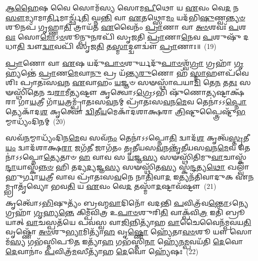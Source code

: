 \-\ul{𑌆}\-\-\ul{𑌹𑍈}\-𑌷 𑌵𑍈 𑌸𑍋𑌮᳴𑌸𑍍𑌯 𑌸𑍋𑌮\-\ul{𑌪𑍀}\-𑌥𑍋 𑌯 \ul{𑌏}\-𑌵𑌂 𑌵𑍇\-\ul{𑌦} 𑌨 \ul{𑌸𑍗}\-𑌮𑍍𑌯𑌾𑌮𑌾\-\ul{𑌰𑍍𑌤𑌿}\-𑌮𑌾𑌰𑍍𑌚𑍍𑌛᳴\-\ul{𑌤𑌿} 𑌘𑍍𑌨\-\ul{𑌨𑍍𑌤𑌿} 𑌵𑌾 \ul{𑌏}\-𑌤𑌥𑍍𑌸𑍋\-\ul{𑌮𑌂} 𑌯𑌦᳴𑌭𑌿\-\ul{𑌷𑍁}\-𑌣𑍍𑌵\-\ul{𑌨𑍍𑌤𑍍𑌯}\-\-\ul{𑍞}\-𑌶𑍂𑌨𑌪᳴ 𑌗𑍃𑌹𑍍𑌣𑌾\-\ul{𑌤𑌿} 𑌤𑍍𑌰𑌾𑌯᳴𑌤 \ul{𑌏}\-𑌵𑍈𑌨𑌂᳴ \ul{𑌪𑍍𑌰𑌾}\-𑌣𑌾 𑌵𑌾 \ul{𑌅}\-\-\ul{𑍞}\-𑌶𑌵𑌃᳴ \ul{𑌪}\-𑌶\-\ul{𑌵𑌃} 𑌸𑍋\-\ul{𑌮𑍋}\-\-𑌽\-\ul{𑍞}\-𑌶𑍂𑌨𑍍𑌪𑍁\-\ul{𑌨}\-𑌰𑌪𑌿᳴ 𑌸𑍃𑌜𑌤𑌿 \ul{𑌪𑍍𑌰𑌾}\-𑌣𑌾\-\ul{𑌨𑍇}\-𑌵 \ul{𑌪}\-𑌶𑍁𑌷𑍁᳴ 𑌦𑌧𑌾\-\ul{𑌤𑌿} 𑌦𑍍𑌵𑍗\-\ul{𑌦𑍍𑌵𑌾}\-𑌵𑌪𑌿᳴ 𑌸𑍃𑌜\-\ul{𑌤𑌿} 𑌤\-\ul{𑌸𑍍𑌮𑌾}\-𑌦𑍍𑌦𑍍𑌵𑍗𑌦𑍍𑌵𑍗॑ \ul{𑌪𑍍𑌰𑌾}\-𑌣𑌾𑌃॥~(19)

{\anuvakamend[{𑌯𑌜𑍁᳴𑌷𑌾 𑌮𑌿𑌮𑍀𑌤 𑌏\-\ul{𑌨𑌂} 𑌜𑌾\-\ul{𑌗𑍃}\-𑌵𑍀\-\ul{𑌤𑌿} 𑌚𑌤𑍁᳴𑌶𑍍𑌚𑌤𑍍𑌵𑌾𑌰𑌿𑍞𑌶𑌚𑍍𑌚}]}%

\-\ul{𑌪𑍍𑌰𑌾}\-𑌣𑍋 𑌵𑌾 \ul{𑌏}\-𑌷 𑌯𑌦𑍁᳴\-\ul{𑌪𑌾}\-\-\ul{𑍞}\-𑌶𑍁𑌰𑍍𑌯𑌦𑍁᳴\-\ul{𑌪𑌾}\-\-\ul{𑍞}\-𑌶𑍍𑌵᳴\-\ul{𑌗𑍍𑌰𑌾} 𑌗𑍍𑌰𑌹𑌾᳴ \ul{𑌗𑍃}\-𑌹𑍍𑌯𑌨𑍍𑌤𑍇॑ \ul{𑌪𑍍𑌰𑌾}\-𑌣\-\ul{𑌮𑍇}\-𑌵𑌾\-\ul{𑌨𑍁} 𑌪𑍍𑌰 𑌯᳴𑌨𑍍𑌤𑍍𑌯\-\ul{𑌰𑍁}\-𑌣𑍋 𑌹᳴ \ul{𑌸𑍍𑌮𑌾}\-𑌹𑍗𑌪᳴𑌵𑍇𑌶𑌿𑌃 𑌪𑍍𑌰𑌾𑌤𑌃𑌸\-\ul{𑌵}\-𑌨 \ul{𑌏}\-𑌵𑌾𑌹𑌂 \ul{𑌯}\-𑌜𑍍𑌞𑍞 𑌸𑍟𑌸𑍍𑌥𑌾᳴𑌪𑌯𑌾\-\ul{𑌮𑌿} 𑌤𑍇\-\ul{𑌨} 𑌤\-\ul{𑌤𑌃} 𑌸𑍟𑌸𑍍𑌥𑌿᳴𑌤𑍇𑌨 𑌚\-\ul{𑌰𑌾}\-𑌮𑍀\-\ul{𑌤𑍍𑌯}\-𑌷𑍍𑌟𑍗 𑌕𑍃𑌤𑍍𑌵𑍋\-𑌽\-\ul{𑌗𑍍𑌰𑍇}\-\-𑌽𑌭𑌿 𑌷𑍁᳴𑌣𑍋\-\ul{𑌤𑍍𑌯}\-𑌷𑍍𑌟𑌾𑌕𑍍𑌷᳴𑌰𑌾 𑌗𑌾\-\ul{𑌯}\-𑌤𑍍𑌰𑍀 𑌗𑌾᳴\-\ul{𑌯}\-𑌤𑍍𑌰𑌮𑍍𑌪𑍍𑌰𑌾᳴𑌤𑌃𑌸\-\ul{𑌵}\-𑌨𑌮𑍍 𑌪𑍍𑌰𑌾᳴𑌤𑌃𑌸\-\ul{𑌵}\-𑌨\-\ul{𑌮𑍇}\-𑌵 𑌤𑍇𑌨𑌾॑𑌽𑌽\-\ul{𑌪𑍍𑌨𑍋}\-𑌤𑍍𑌯𑍇𑌕𑌾᳴\-𑌦\-\ul{𑌶} 𑌕𑍃𑌤𑍍𑌵𑍋॑ \ul{𑌦𑍍𑌵𑌿}\-𑌤𑍀\-\ul{𑌯}\-𑌮𑍇𑌕𑌾᳴\-𑌦𑌶𑌾𑌕𑍍𑌷𑌰𑌾 \ul{𑌤𑍍𑌰𑌿}\-𑌷𑍍𑌟𑍁𑌪𑍍𑌤𑍍𑌰𑍈𑌷𑍍𑌟𑍁᳴\-\ul{𑌭}\-𑌮𑍍𑌮𑌾𑌧𑍍𑌯𑌂᳴𑌦𑌿𑌨𑌮𑍍~(20)

𑌸𑌵᳴\-\ul{𑌨}\-𑌮𑍍𑌮𑌾𑌧𑍍𑌯𑌂᳴𑌦𑌿𑌨\-\ul{𑌮𑍇}\-𑌵 𑌸𑌵᳴\-\ul{𑌨𑌂} 𑌤𑍇𑌨𑌾॑𑌽𑌽𑌪𑍍𑌨𑍋\-\ul{𑌤𑌿} 𑌦𑍍𑌵𑌾𑌦᳴\-\ul{𑌶} 𑌕𑍃𑌤𑍍𑌵᳴\-\ul{𑌸𑍍𑌤𑍃}\-𑌤𑍀\-\ul{𑌯𑌂} 𑌦𑍍𑌵𑌾𑌦᳴𑌶𑌾𑌕𑍍𑌷\-\ul{𑌰𑌾} 𑌜𑌗᳴\-\ul{𑌤𑍀} 𑌜𑌾𑌗᳴𑌤𑌂 𑌤𑍃𑌤𑍀𑌯𑌸\-\ul{𑌵}\-𑌨𑌨𑍍𑌤𑍃᳴𑌤𑍀𑌯𑌸\-\ul{𑌵}\-𑌨\-\ul{𑌮𑍇}\-𑌵 𑌤𑍇𑌨𑌾॑𑌽𑌽𑌪𑍍𑌨𑍋\-\ul{𑌤𑍍𑌯𑍇}\-𑌤𑌾𑍞 \ul{𑌹} 𑌵𑌾𑌵 𑌸 \ul{𑌯}\-𑌜𑍍𑌞\-\ul{𑌸𑍍𑌯} 𑌸𑍟𑌸𑍍𑌥𑌿᳴𑌤𑌿𑌮𑍁\-\ul{𑌵𑌾}\-𑌚𑌾𑌸𑍍𑌕᳴\-\ul{𑌨𑍍𑌦𑌾}\-𑌯𑌾𑌸𑍍𑌕᳴\-\ul{𑌨𑍍𑌨}\-\-\ul{𑍞} 𑌹𑌿 𑌤𑌦𑍍𑌯\-\ul{𑌦𑍍𑌯}\-𑌜𑍍𑌞\-\ul{𑌸𑍍𑌯} 𑌸𑍟𑌸𑍍𑌥𑌿᳴𑌤\-\ul{𑌸𑍍𑌯} 𑌸𑍍𑌕\-\ul{𑌨𑍍𑌦}\-𑌤𑍍𑌯\-\ul{𑌥𑍋} 𑌖𑌲𑍍𑌵𑌾᳴𑌹𑍁𑌰𑍍𑌗𑌾\-\ul{𑌯}\-𑌤𑍍𑌰𑍀 𑌵𑌾𑌵 𑌪𑍍𑌰𑌾᳴𑌤𑌃𑌸\-\ul{𑌵}\-𑌨𑍇 𑌨𑌾\-\ul{𑌤𑌿}\-𑌵𑌾\-\ul{𑌦} 𑌇𑌤𑍍𑌯𑌨᳴𑌤𑌿𑌵𑌾𑌦𑍁𑌕 𑌏\-\ul{𑌨}\-𑌮𑍍𑌭𑍍𑌰𑌾𑌤𑍃᳴𑌵𑍍𑌯𑍋 𑌭𑌵\-\ul{𑌤𑌿} 𑌯 \ul{𑌏}\-𑌵𑌂 𑌵𑍇\-\ul{𑌦} 𑌤𑌸𑍍𑌮𑌾᳴\-\ul{𑌦}\-𑌷𑍍𑌟𑌾𑌵᳴𑌷𑍍𑌟𑍗~(21)

𑌕𑍃𑌤𑍍𑌵𑍋᳴\-𑌽\-\ul{𑌭𑌿}\-𑌷𑍁𑌤𑍍𑌯𑌂᳴ 𑌬𑍍𑌰𑌹𑍍𑌮\-\ul{𑌵𑌾}\-𑌦𑌿𑌨𑍋᳴ 𑌵𑌦𑌨𑍍𑌤𑌿 \ul{𑌪}\-𑌵𑌿𑌤𑍍𑌰᳴𑌵\-\ul{𑌨𑍍𑌤𑍋}\-\-𑌽𑌨𑍍𑌯𑍇 𑌗𑍍𑌰𑌹𑌾᳴ \ul{𑌗𑍃}\-𑌹𑍍𑌯\-\ul{𑌨𑍍𑌤𑍇} 𑌕𑌿𑌮𑍍𑌪᳴𑌵𑌿𑌤𑍍𑌰 𑌉\-\ul{𑌪𑌾}\-\-\ul{𑍞}\-𑌶𑍁𑌰𑌿\-\ul{𑌤𑌿} 𑌵𑌾𑌕𑍍𑌪᳴𑌵𑌿\-\ul{𑌤𑍍𑌰} 𑌇𑌤𑌿᳴ 𑌬𑍍𑌰𑍂𑌯𑌾𑌤𑍍 \ul{𑌵𑌾}\-𑌚𑌸𑍍𑌪𑌤᳴𑌯𑍇 𑌪𑌵𑌸𑍍𑌵 𑌵𑌾\-\ul{𑌜𑌿}\-𑌨𑍍𑌨𑌿𑌤𑍍𑌯𑌾᳴𑌹 \ul{𑌵𑌾}\-𑌚𑍈𑌵𑍈𑌨᳴𑌮𑍍𑌪𑌵𑌯\-\ul{𑌤𑌿} 𑌵𑍃𑌷𑍍𑌣𑍋᳴ \ul{𑌅}\-\-\ul{𑍞}\-𑌶𑍁\-\ul{𑌭𑍍𑌯𑌾}\-𑌮𑌿𑌤𑍍𑌯𑌾᳴\-\ul{𑌹} 𑌵𑍃\-\ul{𑌷𑍍𑌣𑍋} 𑌹𑍍𑌯𑍇᳴𑌤𑌾\-\ul{𑌵}\-\-\ul{𑍞}\-𑌶𑍂 𑌯𑍗 𑌸𑍋𑌮᳴\-\ul{𑌸𑍍𑌯} 𑌗𑌭᳴𑌸𑍍𑌤𑌿𑌪𑍂\-\ul{𑌤} 𑌇𑌤𑍍𑌯𑌾᳴\-\ul{𑌹} 𑌗𑌭᳴𑌸𑍍𑌤𑌿\-\ul{𑌨𑌾} 𑌹𑍍𑌯𑍇᳴𑌨\-\ul{𑌮𑍍𑌪}\-𑌵𑌯᳴𑌤𑌿 \ul{𑌦𑍇}\-𑌵𑍋 \ul{𑌦𑍇}\-𑌵𑌾𑌨𑌾𑌂॑ \ul{𑌪}\-𑌵𑌿𑌤𑍍𑌰᳴\-\ul{𑌮}\-𑌸𑍀𑌤𑍍𑌯𑌾᳴𑌹 \ul{𑌦𑍇}\-𑌵𑍋 𑌹𑍍𑌯𑍇᳴𑌷𑌃~(22)

